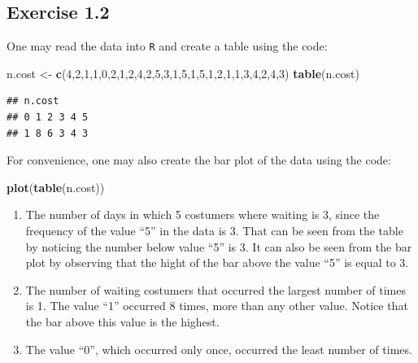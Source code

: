 \documentclass[]{krantz}
\makeatletter
\newenvironment{Shaded}{\begin{snugshade}}{\end{snugshade}}
\newcommand{\DecValTok}[1]{\textcolor[rgb]{0.00,0.00,0.81}{#1}}
\newcommand{\KeywordTok}[1]{\textcolor[rgb]{0.13,0.29,0.53}{\textbf{#1}}}
\newcommand{\NormalTok}[1]{#1}
\newcommand{\StringTok}[1]{\textcolor[rgb]{0.31,0.60,0.02}{#1}}
\newenvironment{kframe}{%
\medskip{}
\setlength{\fboxsep}{.8em}
 \def\at@end@of@kframe{}%
 \ifinner\ifhmode%
  \def\at@end@of@kframe{\end{minipage}}%
  \begin{minipage}{\columnwidth}%
 \fi\fi%
 \def\FrameCommand##1{\hskip\@totalleftmargin \hskip-\fboxsep
 \colorbox{shadecolor}{##1}\hskip-\fboxsep
     \hskip-\linewidth \hskip-\@totalleftmargin \hskip\columnwidth}%
 \MakeFramed {\advance\hsize-\width
   \@totalleftmargin\z@ \linewidth\hsize
   \@setminipage}}%
 {\par\unskip\endMakeFramed%
 \at@end@of@kframe}
\renewenvironment{Shaded}{\begin{kframe}}{\end{kframe}}
\theoremstyle{definition}
\theoremstyle{definition}
\theoremstyle{definition}
\theoremstyle{remark}
\makeatother
\begin{document}
\hypertarget{exercise-1.2}{%
\subsection*{Exercise 1.2}\label{exercise-1.2}}


One may read the data into \texttt{R} and create a table using the code:

\begin{Shaded}
\begin{Highlighting}[]
\NormalTok{    n.cost <-}\StringTok{ }\KeywordTok{c}\NormalTok{(}\DecValTok{4}\NormalTok{,}\DecValTok{2}\NormalTok{,}\DecValTok{1}\NormalTok{,}\DecValTok{1}\NormalTok{,}\DecValTok{0}\NormalTok{,}\DecValTok{2}\NormalTok{,}\DecValTok{1}\NormalTok{,}\DecValTok{2}\NormalTok{,}\DecValTok{4}\NormalTok{,}\DecValTok{2}\NormalTok{,}\DecValTok{5}\NormalTok{,}\DecValTok{3}\NormalTok{,}\DecValTok{1}\NormalTok{,}\DecValTok{5}\NormalTok{,}\DecValTok{1}\NormalTok{,}\DecValTok{5}\NormalTok{,}\DecValTok{1}\NormalTok{,}\DecValTok{2}\NormalTok{,}\DecValTok{1}\NormalTok{,}\DecValTok{1}\NormalTok{,}\DecValTok{3}\NormalTok{,}\DecValTok{4}\NormalTok{,}\DecValTok{2}\NormalTok{,}\DecValTok{4}\NormalTok{,}\DecValTok{3}\NormalTok{)}
    \KeywordTok{table}\NormalTok{(n.cost)}
\end{Highlighting}
\end{Shaded}

\begin{verbatim}
## n.cost
## 0 1 2 3 4 5 
## 1 8 6 3 4 3
\end{verbatim}

For convenience, one may also create the bar plot of the data using the code:

\begin{Shaded}
\begin{Highlighting}[]
\KeywordTok{plot}\NormalTok{(}\KeywordTok{table}\NormalTok{(n.cost))}
\end{Highlighting}
\end{Shaded}

\begin{enumerate}
\def\labelenumi{\arabic{enumi}.}
\item
  The number of days in which 5
  costumers where waiting is 3, since the frequency of the value ``5'' in
  the data is 3. That can be seen from the table by noticing the number
  below value ``5'' is 3. It can also be seen from the bar plot by observing
  that the hight of the bar above the value ``5'' is equal to 3.
\item
  The number of waiting costumers that
  occurred the largest number of times is 1. The value ``1'' occurred 8
  times, more than any other value. Notice that the bar above this value
  is the highest.
\item
  The value ``0'', which occurred only
  once, occurred the least number of times.
\end{enumerate}
\end{document}
